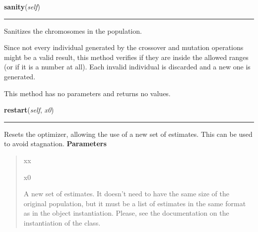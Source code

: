     \label{peach:ga:base:GeneticAlgorithm:sanity}

    \vspace{0.5ex}

\hspace{.8\funcindent}\begin{boxedminipage}{\funcwidth}

    \raggedright \textbf{sanity}(\textit{self})

    \vspace{-1.5ex}

    \rule{\textwidth}{0.5\fboxrule}
\setlength{\parskip}{2ex}

Sanitizes the chromosomes in the population.

Since not every individual generated by the crossover and mutation
operations might be a valid result, this method verifies if they are
inside the allowed ranges (or if it is a number at all). Each invalid
individual is discarded and a new one is generated.

This method has no parameters and returns no values.
\setlength{\parskip}{1ex}
    \end{boxedminipage}

    \label{peach:ga:base:GeneticAlgorithm:restart}

    \vspace{0.5ex}

\hspace{.8\funcindent}\begin{boxedminipage}{\funcwidth}

    \raggedright \textbf{restart}(\textit{self}, \textit{x0})

    \vspace{-1.5ex}

    \rule{\textwidth}{0.5\fboxrule}
\setlength{\parskip}{2ex}

Resets the optimizer, allowing the use of a new set of estimates. This
can be used to avoid stagnation.
\setlength{\parskip}{1ex}
      \textbf{Parameters}
      \vspace{-1ex}

      \begin{quote}
        \begin{Ventry}{xx}

          \item[x0]


A new set of estimates. It doesn't need to have the same size of the
original population, but it must be a list of estimates in the same
format as in the object instantiation. Please, see the documentation
on the instantiation of the class.
        \end{Ventry}

      \end{quote}

    \end{boxedminipage}

